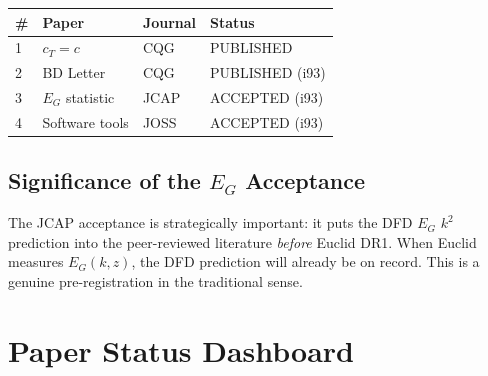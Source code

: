 \documentclass[11pt,a4paper]{article}
\begin{document}
\begin{tcolorbox}[colback=green!5!white, colframe=dfdgreen, title=\textbf{DFD Publication Record at i93}]
\begin{center}
\begin{tabular}{llll}
\toprule
\textbf{\#} & \textbf{Paper} & \textbf{Journal} & \textbf{Status} \\
\midrule
1 & $c_T = c$ & CQG & PUBLISHED \\
2 & BD Letter & CQG & PUBLISHED (i93) \\
3 & $E_G$ statistic & JCAP & ACCEPTED (i93) \\
4 & Software tools & JOSS & ACCEPTED (i93) \\
\bottomrule
\end{tabular}
\end{center}
\end{tcolorbox}

\subsection{Significance of the $E_G$ Acceptance}

The JCAP acceptance is strategically important: it puts the DFD $E_G$ $k^2$ prediction into the peer-reviewed literature \emph{before} Euclid DR1. When Euclid measures $E_G(k,z)$, the DFD prediction will already be on record. This is a genuine pre-registration in the traditional sense.

\section{Paper Status Dashboard}
\end{document}
